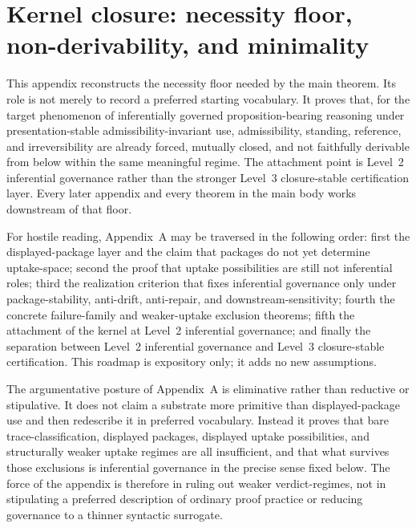 \documentclass[11pt]{article}
\theoremstyle{plain}
\theoremstyle{definition}
\begin{document}
\appendix


\section{Kernel closure: necessity floor, non-derivability, and minimality}
\label{app:kernel}

This appendix reconstructs the necessity floor needed by the main theorem. Its role is not merely to record a preferred starting vocabulary. It proves that, for the target phenomenon of inferentially governed proposition-bearing reasoning under presentation-stable admissibility-invariant use, admissibility, standing, reference, and irreversibility are already forced, mutually closed, and not faithfully derivable from below within the same meaningful regime. The attachment point is Level~2 inferential governance rather than the stronger Level~3 closure-stable certification layer. Every later appendix and every theorem in the main body works downstream of that floor.

For hostile reading, Appendix~A may be traversed in the following order: first the displayed-package layer and the claim that packages do not yet determine uptake-space; second the proof that uptake possibilities are still not inferential roles; third the realization criterion that fixes inferential governance only under package-stability, anti-drift, anti-repair, and downstream-sensitivity; fourth the concrete failure-family and weaker-uptake exclusion theorems; fifth the attachment of the kernel at Level~2 inferential governance; and finally the separation between Level~2 inferential governance and Level~3 closure-stable certification. This roadmap is expository only; it adds no new assumptions.

The argumentative posture of Appendix~A is eliminative rather than reductive or stipulative. It does not claim a substrate more primitive than displayed-package use and then redescribe it in preferred vocabulary. Instead it proves that bare trace-classification, displayed packages, displayed uptake possibilities, and structurally weaker uptake regimes are all insufficient, and that what survives those exclusions is inferential governance in the precise sense fixed below. The force of the appendix is therefore in ruling out weaker verdict-regimes, not in stipulating a preferred description of ordinary proof practice or reducing governance to a thinner syntactic surrogate.
\end{document}
